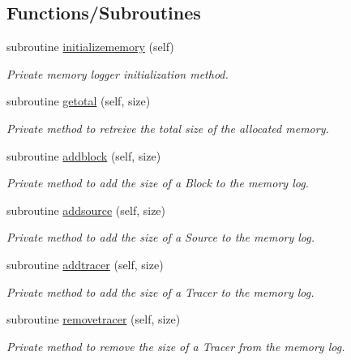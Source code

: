 \subsection*{Functions/\+Subroutines}
\begin{DoxyCompactItemize}
\item 
subroutine \mbox{\hyperlink{namespacesimulation__memory__mod_ac8306165e4ec88fec9a2b8b719f61893}{initializememory}} (self)
\begin{DoxyCompactList}\small\item\em Private memory logger initialization method. \end{DoxyCompactList}\item 
subroutine \mbox{\hyperlink{namespacesimulation__memory__mod_acf04d6b930ed3ffbc0950afd86033c51}{getotal}} (self, size)
\begin{DoxyCompactList}\small\item\em Private method to retreive the total size of the allocated memory. \end{DoxyCompactList}\item 
subroutine \mbox{\hyperlink{namespacesimulation__memory__mod_a4169689db37b3ba35e092096a7019f80}{addblock}} (self, size)
\begin{DoxyCompactList}\small\item\em Private method to add the size of a Block to the memory log. \end{DoxyCompactList}\item 
subroutine \mbox{\hyperlink{namespacesimulation__memory__mod_a940ff42fa3a49423f9ac98da2bffa54c}{addsource}} (self, size)
\begin{DoxyCompactList}\small\item\em Private method to add the size of a Source to the memory log. \end{DoxyCompactList}\item 
subroutine \mbox{\hyperlink{namespacesimulation__memory__mod_a5770021491589bbd61ea112d113a9c9d}{addtracer}} (self, size)
\begin{DoxyCompactList}\small\item\em Private method to add the size of a Tracer to the memory log. \end{DoxyCompactList}\item 
subroutine \mbox{\hyperlink{namespacesimulation__memory__mod_a5f95539e9740401e7046b79c40ad2ecd}{removetracer}} (self, size)
\begin{DoxyCompactList}\small\item\em Private method to remove the size of a Tracer from the memory log. \end{DoxyCompactList}\item 

\end{DoxyCompactItemize}
